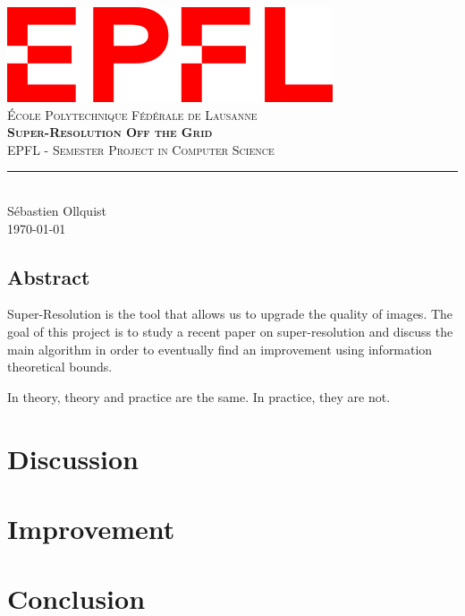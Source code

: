 \documentclass[11pt,titlepage]{report}
\begin{document}
\begin{titlepage}
	\centering
    \includegraphics[width=0.5\linewidth]{images/EPFL.png}\\[0.25cm] 	%
    \textsc{\LARGE École Polytechnique Fédérale de Lausanne}\\ \vspace{\fill}
    \textbf{\textsc{\fontsize{30}{30}\selectfont Super-Resolution Off the Grid}}\\ \vspace{\fill}		
	\textsc{\LARGE EPFL - Semester Project in Computer Science}\\[0.4cm]
	\rule{\linewidth}{0.2 mm} \\[0.5 cm]
	Sébastien Ollquist \\[2cm] \today
\end{titlepage}
\restoregeometry

\thispagestyle{numberonly}
\begin{summary}
\section*{Abstract}
Super-Resolution is the tool that allows us to upgrade the quality of images. The goal of this project is to study a recent paper on super-resolution and discuss the main algorithm in order to eventually find an improvement using information theoretical bounds.
\end{summary}

\begin{fquote}
    In theory, theory and practice are the same. In practice, they are not.
\end{fquote}






\chapter{Discussion}

\chapter{Improvement}

\chapter{Conclusion}

\appendix


\clearpage
\pagestyle{numberonly}
\printbibliography
\end{document}
